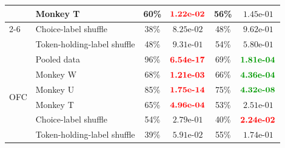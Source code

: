 \documentclass[pdflatex,sn-mathphys-num]{sn-jnl}%
\begin{document}
\begin{table}[p]
\begin{tabular*}{\textwidth}{@{\extracolsep{\fill}}llcccc@{}}
 & Monkey T & 60\% & $\textcolor{red}{\text{\bfseries \mbox{1.22e-02}}}$ & 56\% & $\mbox{1.45e-01}$ \\
\cmidrule(l){2-6}
 & Choice-label shuffle & 38\% & $\mbox{8.25e-02}$ & 48\% & $\mbox{9.62e-01}$ \\
 & Token-holding-label shuffle & 48\% & $\mbox{9.31e-01}$ & 54\% & $\mbox{5.80e-01}$ \\
\midrule
\multirow{6}{*}{OFC}
 & Pooled data & 96\% & $\textcolor{red}{\text{\bfseries \mbox{6.54e-17}}}$ & 69\% & $\textcolor{green!60!black}{\text{\bfseries \mbox{1.81e-04}}}$ \\
 & Monkey W & 68\% & $\textcolor{red}{\text{\bfseries \mbox{1.21e-03}}}$ & 66\% & $\textcolor{green!60!black}{\text{\bfseries \mbox{4.36e-04}}}$ \\
 & Monkey U & 85\% & $\textcolor{red}{\text{\bfseries \mbox{1.75e-14}}}$ & 75\% & $\textcolor{green!60!black}{\text{\bfseries \mbox{4.32e-08}}}$ \\
 & Monkey T & 65\% & $\textcolor{red}{\text{\bfseries \mbox{4.96e-04}}}$ & 53\% & $\mbox{2.51e-01}$ \\
\cmidrule(l){2-6}
 & Choice-label shuffle & 54\% & $\mbox{2.79e-01}$ & 40\% & $\textcolor{red}{\text{\bfseries \mbox{2.24e-02}}}$ \\
 & Token-holding-label shuffle & 39\% & $\mbox{5.91e-02}$ & 55\% & $\mbox{1.74e-01}$ \\
\bottomrule
\end{tabular*}
\end{table}
\end{document}
